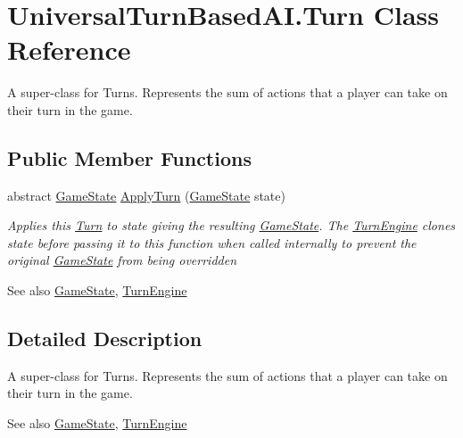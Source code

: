 \hypertarget{class_universal_turn_based_a_i_1_1_turn}{}\section{Universal\+Turn\+Based\+A\+I.\+Turn Class Reference}
\label{class_universal_turn_based_a_i_1_1_turn}


A super-\/class for Turns. Represents the sum of actions that a player can take on their turn in the game.  


\subsection*{Public Member Functions}
\begin{DoxyCompactItemize}
\item 
abstract \hyperlink{class_universal_turn_based_a_i_1_1_game_state}{Game\+State} \hyperlink{class_universal_turn_based_a_i_1_1_turn_aa28ba0a68683fda933158b242c683b22}{Apply\+Turn} (\hyperlink{class_universal_turn_based_a_i_1_1_game_state}{Game\+State} state)
\begin{DoxyCompactList}\small\item\em Applies this \hyperlink{class_universal_turn_based_a_i_1_1_turn}{Turn} to {\itshape state}  giving the resulting \hyperlink{class_universal_turn_based_a_i_1_1_game_state}{Game\+State}. The \hyperlink{class_universal_turn_based_a_i_1_1_turn_engine}{Turn\+Engine} clones {\itshape state}  before passing it to this function when called internally to prevent the original \hyperlink{class_universal_turn_based_a_i_1_1_game_state}{Game\+State} from being overridden \begin{DoxySeeAlso}{See also}
\hyperlink{class_universal_turn_based_a_i_1_1_game_state}{Game\+State}, \hyperlink{class_universal_turn_based_a_i_1_1_turn_engine}{Turn\+Engine}


\end{DoxySeeAlso}
\end{DoxyCompactList}\end{DoxyCompactItemize}


\subsection{Detailed Description}
A super-\/class for Turns. Represents the sum of actions that a player can take on their turn in the game. 

\begin{DoxySeeAlso}{See also}
\hyperlink{class_universal_turn_based_a_i_1_1_game_state}{Game\+State}, \hyperlink{class_universal_turn_based_a_i_1_1_turn_engine}{Turn\+Engine}


\end{DoxySeeAlso}


